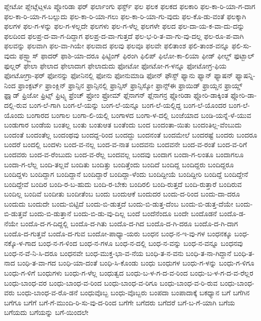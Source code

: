 {ಪ್ಲೇಟೋ
ಪ್ಲೇಟ್ಲೆಟ್ಗಳೂ
ಪ್ಲೋರಿಡಾ
ಫರ್
ಫರ್ಲಾಂಗು
ಫರ್ಸ್ಟ್
ಫಲ
ಫಲಕ
ಫಲಕದ
ಫಲಕಾರಿ
ಫಲ-ಕಾ-ರಿ-ಯಾ-ಗ-ದಾಗ
ಫಲ-ಕಾ-ರಿ-ಯಾ-ಗ-ಬಲ್ಲುದು
ಫಲ-ಕಾ-ರಿ-ಯಾ-ಗಲು
ಫಲ-ಕಾ-ರಿ-ಯಾ-ಗು-ವುದು
ಫಲ-ಕೊ-ಡು-ವಂತೆ
ಫಲಕ್ಕಾಗಿ
ಫಲಗಳ
ಫಲ-ಗ-ಳನ್ನು
ಫಲ-ಗ-ಳಲ್ಲದೇ
ಫಲಗಳು
ಫಲ-ಗ-ಳೆಲ್ಲ
ಫಲಗಳೇ
ಫಲದ
ಫಲ-ದಾ-ಯ-ಕ-ವಾ-ದು-ದನ್ನು
ಫಲದಿಂದ
ಫಲಪ್ರ-ದ-ವಾ-ಗ-ದಿದ್ದಾಗ
ಫಲಪ್ರ-ದ-ವಾ-ಗುತ್ತದೆ
ಫಲ-ಭ-ರಿ-ತ-ವಾ-ಗು-ವು-ದಲ್ಲ
ಫಲ-ರೂ-ಪ-ವಾಗಿ
ಫಲವನ್ನು
ಫಲವಾಗಿ
ಫಲ-ವಾ-ಗಿಯೇ
ಫಲವಾದ
ಫಲವು
ಫಲವೂ
ಫಲವೇ
ಫಲಿತಾಂಶ
ಫಲಿ-ತಾಂಶ-ವನ್ನೂ
ಫಲಿ-ಸು-ವುದು
ಫಸ್ಟ್ಕ್ಲಾಸ್
ಫಾದರ್
ಫಾಶಿ-ಯಾ-ದರೂ
ಫಿಟ್ಟಿಂಗ್
ಫಿರಂಗಿ
ಫಿಲಿಪ್
ಫಿಲೋ-ಕಾ-ಲಿಯಾ
ಫೀಡ್
ಫೀಲ್ಡ್
ಫುಟ್ಬಾಲ್
ಫುಲ್ಲರ್
ಫೇಲಾ
ಫೇಲಾದ
ಫೇಲಾದಾಗ
ಫೇಲಾದುದು
ಫೋಟೋ
ಫೋಟೋ-ಗ-ಳನ್ನೂ
ಫೋಟೋಗ್ರ-ಫಿಯ
ಫೋಟೋಗ್ರಾ-ಫರ್
ಫೋನನ್ನು
ಫೋನಿನಲ್ಲಿ
ಫೋನು
ಫೋನುಮಾಡಿ
ಫೋನ್
ಫೌಸ್ಟ್
ಫ್ಯಾನು
ಫ್ಯಾನ್
ಫ್ಯಾಷನ್
ಫ್ಯಾಷನ್ನಿ-ನಿಂದ
ಫ್ರಾಂಕ್ಫರ್ಟ್
ಫ್ರಾಂಕ್ಲಿನ್
ಫ್ರಾನ್ಸಿನ
ಫ್ರಾನ್ಸಿನಲ್ಲಿ
ಫ್ರಾನ್ಸಿಸ್
ಫ್ರಾನ್ಸಿಸ್ಕೋ
ಫ್ರಾನ್ಸ್ಈ
ಫ್ರಾಯಿಡ್
ಫ್ರಾಯ್ಡನ
ಫ್ರಾಯ್ಡ್
ಫ್ರಾೖಡ್
ಫ್ರಿಜೋ
ಫ್ರಿಟ್ಸ್
ಫ್ರಿಟ್ಸ್ನ
ಫ್ರೆಂಚ್
ಫ್ರೋಂ
ಫ್ರೋಮ್
ಫ್ಲೆನಾಗನ್
ಫ್ಲೆನಾಗನ್ರ
ಫ್ಲೋರಿಡಾ
ಫ್ಲೋರಿ-ಡಾಕ್ಕಿಂತ
ಫ್ಲೋರಿ-ಡಾ-ದಲ್ಲಿ-ರುವ
ಬಂಗ-ಲೆ-ಗಾಗಿ
ಬಂಗ-ಲೆ-ಯನ್ನು
ಬಂಗ-ಲೆ-ಯನ್ನೂ
ಬಂಗ-ಲೆ-ಯಲ್ಲಿದ್ದ
ಬಂಗ-ಲೆ-ಯೊಂದರ
ಬಂಗ-ಲೆ-ಯೊಂದು
ಬಂಗಾರದ
ಬಂಗಾಲ
ಬಂಗಾ-ಲಿ-ಯಲ್ಲಿ
ಬಂಗಾಳದ
ಬಂಗಾ-ಳ-ದಲ್ಲಿ
ಬಂಜೆಯಾದ
ಬಂಡಿ-ಯನ್ನೆ-ಳೆ-ಯುವ
ಬಂಡುಗಾರ
ಬಂಡೆಯ
ಬಂತಲ್ಲ
ಬಂತು
ಬಂತುಆತ
ಬಂತೆಂದು
ಬಂದ
ಬಂದಂತಾ-ಯಿತು
ಬಂದಂತಿಲ್ಲ-ವೆಂಬುದು
ಬಂದಂತೆ
ಬಂದಂತೆಲ್ಲ
ಬಂದಂಥವು
ಬಂದದ್ದ-ರಿಂದ
ಬಂದದ್ದು
ಬಂದನಂತೆ
ಬಂದಮೇಲೆ
ಬಂದರಷ್ಟೆ
ಬಂದರು
ಬಂದರೂ
ಬಂದರೆ
ಬಂದಲ್ಲಿ
ಬಂದಳು
ಬಂದ-ವ-ನಲ್ಲ
ಬಂದ-ವ-ನಾತ
ಬಂದವನು
ಬಂದವನೇ
ಬಂದ-ವ-ರಂತೆ
ಬಂದ-ವ-ರಿಗೆ
ಬಂದವರು
ಬಂದ-ವ-ರೆಂಬುದು
ಬಂದ-ವ-ರೆಲ್ಲ
ಬಂದವಲ್ಲ
ಬಂದವು
ಬಂದಾಗ
ಬಂದಾ-ಗ-ಲಂತೂ
ಬಂದಾಗಲೂ
ಬಂದಾ-ಗ-ಲೆಲ್ಲ
ಬಂದಿ-ತಲ್ಲವೆ
ಬಂದಿತು
ಬಂದಿತ್ತು
ಬಂದಿತ್ತೆಂದು
ಬಂದಿದೆ
ಬಂದಿದ್ದ
ಬಂದಿದ್ದರು
ಬಂದಿದ್ದರೂ
ಬಂದಿದ್ದಳು
ಬಂದಿದ್ದಾಗ
ಬಂದಿದ್ದಾನೆ
ಬಂದಿದ್ದಾರೆ
ಬಂದಿದ್ದಾ-ಳೆಂದು
ಬಂದಿದ್ದೀಯೆ
ಬಂದಿದ್ದೀರಿ
ಬಂದಿದ್ದೆ
ಬಂದಿದ್ದೇನೆ
ಬಂದಿದ್ದೇವೆ
ಬಂದಿರ
ಬಂದಿ-ರ-ಬ-ಹುದು
ಬಂದಿ-ರ-ಬೇಕು
ಬಂದಿರಲಿ
ಬಂದಿ-ರುತ್ತದೆ
ಬಂದಿ-ರುತ್ತಾರೆ
ಬಂದಿರುವ
ಬಂದಿಲ್ಲ
ಬಂದಿವೆ
ಬಂದೀತು
ಬಂದೀತೆಂಬ
ಬಂದು
ಬಂದುಆಕೆ
ಬಂದುದರ
ಬಂದು-ದ-ರಿಂದ
ಬಂದು-ದಾ-ದರೂ
ಬಂದುದು
ಬಂದುದೇ
ಬಂದು-ಬಿಟ್ಟಿದೆ
ಬಂದು-ಬಿ-ಡುತ್ತದೆ
ಬಂದು-ಬಿ-ಡುತ್ತ-ದೆಂಬ
ಬಂದು-ಬಿ-ಡುತ್ತ-ದೆಯೇ
ಬಂದು-ಬಿ-ಡುತ್ತವೆ
ಬಂದು-ಬಿ-ಡುತ್ತಾನೆ
ಬಂದು-ಬಿ-ಡು-ವು-ದಿಲ್ಲ
ಬಂದೆ
ಬಂದೆನೆಂದೂ
ಬಂದೇ
ಬಂದೊಡನೆ
ಬಂದೊ-ಡ-ನೆಯೇ
ಬಂದೊ-ದ-ಗ-ದಿದ್ದಲ್ಲಿ
ಬಂದೊ-ದ-ಗಿತು
ಬಂದೊ-ದ-ಗಿದ
ಬಂದೊ-ದ-ಗಿ-ದರೂ
ಬಂದೊ-ದ-ಗಿ-ದಾಗ
ಬಂದೊ-ದ-ಗುತ್ತವೆ
ಬಂದೊ-ದ-ಗುವ
ಬಂದೋ-ಪಾಧ್ಯಾ-ಯರು
ಬಂಧನ
ಬಂಧ-ನ-ಇ-ವು-ಗಳ
ಬಂಧನಕ್ಕೂ
ಬಂಧ-ನಕ್ಕೊ-ಳ-ಗಾದ
ಬಂಧ-ನ-ಗ-ಳಿಂದ
ಬಂಧ-ನ-ಗಳೂ
ಬಂಧ-ನ-ದಲ್ಲಿ
ಬಂಧ-ನ-ವನ್ನು
ಬಂಧ-ನ-ವನ್ನೂ
ಬಂಧನವು
ಬಂಧ-ನ-ವೆ-ನಿ-ಸಿ-ದರೂ
ಬಂಧನವೇ
ಬಂಧ-ಮುಕ್ತ-ಭಾ-ವ-ನೆಯ
ಬಂಧಿ-ತ-ನ-ವನು
ಬಂಧಿ-ತ-ನಾ-ಗಿದ್ದಾನೆ
ಬಂಧಿ-ತ-ನಾದ
ಬಂಧಿ-ತ-ವಾ-ಗದ
ಬಂಧಿ-ಯಾ-ದಂತೆ
ಬಂಧಿ-ಸಿ-ಕೊಂಡು
ಬಂಧು
ಬಂಧುಗಳ
ಬಂಧು-ಗ-ಳನ್ನು
ಬಂಧು-ಗ-ಳಿಗೂ
ಬಂಧು-ಗ-ಳಿಗೆ
ಬಂಧುಗಳು
ಬಂಧು-ಗ-ಳೆಲ್ಲ
ಬಂಧುತ್ವದ
ಬಂಧು-ಬ-ಳ-ಗ-ದ-ವ-ರಿಂದ
ಬಂಧು-ಬ-ಳ-ಗ-ದ-ವ-ರೆಲ್ಲರ
ಬಂಧು-ಬಾಂಧ-ವರ
ಬಂಧು-ಬಾಂಧ-ವ-ರಿಂದ
ಬಂಧು-ಬಾಂಧ-ವ-ರಿಗೂ
ಬಂಧು-ಬಾಂಧ-ವ-ರಿ-ರುವ
ಬಂಧು-ಬಾಂಧ-ವರು
ಬಂಧು-ಬಾಂಧ-ವ-ರೊ-ಡನೆ
ಬಂಧುವೊಬ್ಬ
ಬಂಧು-ವೊಬ್ಬರು
ಬಂಪದಾ
ಬಂಪಾದಾಕ್ಕೆ
ಬಕಧ್ಯಾನ
ಬಗೆ
ಬಗೆಗಿನ
ಬಗೆಗೂ
ಬಗೆಗೆ
ಬಗೆ-ಗೆ-ಮುಂದಿ-ರಿ-ಸು-ವು-ದ-ರಿಂದ
ಬಗೆಗೇ
ಬಗೆದರು
ಬಗೆದರೆ
ಬಗೆ-ಬ-ಗೆ-ಯಾಗಿ
ಬಗೆಯ
ಬಗೆಯದು
ಬಗೆಯನ್ನು
ಬಗೆ-ಯಿಂದಲೇ
}
